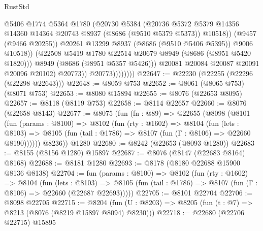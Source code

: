 \begin{lexlean}{RustStd}
\begin{coremodule}
                                @5406
                                @1774
                                @5364
                                @1780
                                (@20730
                                  @5384
                                  (@20736
                                    @5372
                                    @5379
                                    @14356
                                    @14360
                                    @14364
                                    @20743
                                    @8937
                                    (@8686 (@9510 @5379 @5373))
                                    @10518))
                                (@9457 (@9466 @20255))
                                @20261
                                @13299
                                @8937
                                (@8686 (@9510 @5406 @5395))
                                @9006
                                @10518))
                            (@22508 @5419 @1780 @22514 @20679 @8949 (@8686 (@8951 @5420 @1820)))
                            @8949
                            (@8686 (@8951 @5357 @5426)))
                          @20081
                          @20084
                          @20087
                          @20091
                          @20096
                          @20102)
                        @20773))
                    @20773))))))))
@22647 := @22230 (@22255 (@22296 (@22298 @22643)))
@22648 := @8059 @753
@22652 := @8061 (@8065 @753) (@8071 @753)
@22653 := @8080 @15894
@22655 := @8076 (@22653 @8095)
@22657 := @8118 (@8119 @753)
@22658 := @8114 @22657
@22660 := @8076 (@22658 @8143)
@22677 := @8075
    (fun (fn : @89) =>
    @22655
      (@8098
        (@8101
          (fun (params : @8100) =>
          @8102
            (fun (rty : @1602) =>
            @8104
              (fun (lets : @8103) =>
              @8105 (fun (tail : @1786) => @8107 (fun (Γ : @8106) => @22660 @8190))))))
        @8236))
    @1280
@22680 := @8242 (@22653 (@8093 @1280))
@22683 := @8155 (@8156 @1280) @15897
@22687 := @8076 (@8147 (@22683 @8164) @8168)
@22688 := @8181 @1280
@22693 := @8178 (@8180 @22688 @15900 @8136 @8138)
@22704 := fun (params : @8100) =>
  @8102
    (fun (rty : @1602) =>
    @8104
      (fun (lets : @8103) =>
      @8105 (fun (tail : @1786) => @8107 (fun (Γ : @8106) => @22660 (@22687 @22693)))))
@22705 := @8101 @22704
@22706 := @8098 @22705
@22715 := @8204
    (fun (U : @8203) => @8205 (fun (t : @7) => @8213 (@8076 (@8219 @15897 @8094) @8230)))
@22718 := @22680 (@22706 @22715) @15895

\end{coremodule}
\end{lexlean}
